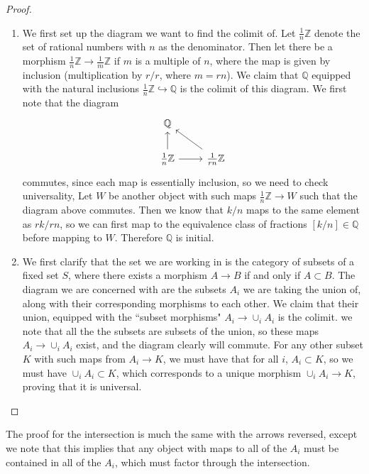 \documentclass[psamsfonts]{amsart}
\theoremstyle{definition}
\theoremstyle{remark}
\newcommand{\Q}{\mathbb{Q}}
\newcommand{\Z}{\mathbb{Z}}
\begin{document}
\begin{proof}
\begin{enumerate}
\item We first set up the diagram we want to find the colimit of. Let $\frac{1}{n}\Z$ denote the set of rational numbers with $n$ as the denominator. Then let there be a morphism $\frac{1}{n}\Z \to \frac{1}{m}\Z$ if $m$ is a multiple of $n$, where the map is given by inclusion (multiplication by $r/r$, where $m = rn$). We claim that $\Q$ equipped with the natural inclusions $\frac{1}{n}\Z \hookrightarrow \Q$ is the colimit of this diagram. We first note that the diagram
$$\begin{tikzcd}
\Q \\
\frac{1}{n}\Z \arrow[r] \arrow[u] & \frac{1}{rn}\Z \arrow[ul]
\end{tikzcd}$$
commutes, since each map is essentially inclusion, so we need to check universality, Let $W$ be another object with such maps $\frac{1}{n}\Z \to W$ such that the diagram above commutes. Then we know that $k/n$ maps to the same element as $rk/rn$, so we can first map to the equivalence class of fractions $[k/n] \in \Q$ before mapping to $W$. Therefore $\Q$ is initial.
\item We first clarify that the set we are working in is the category of subsets of a fixed set $S$, where there exists a morphism $A \to B$ if and only if $A \subset B$. The diagram we are concerned with are the subsets $A_i$ we are taking the union of, along with their corresponding morphisms to each other. We claim that their union, equipped with the 	``subset morphisms" $A_i \to \cup_i A_i$ is the colimit. we note that all the the subsets are subsets of the union, so these maps $A_i \to \cup_i A_i$ exist, and the diagram clearly will commute. For any other subset $K$ with such maps from $A_i \to K$, we must have that for all $i$, $A_i \subset K$, so we must have $\cup_i A_i \subset K$, which corresponds to a unique morphism $\cup_i A_i \to K$, proving that it is universal.
\end{enumerate}
\end{proof}

The proof for the intersection is much the same with the arrows reversed, except we note that this implies that any object with maps to all of the $A_i$ must be contained in all of the $A_i$, which must factor through the intersection.
\end{document}
